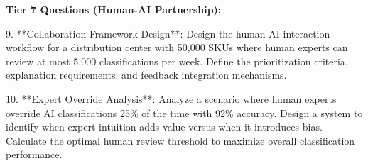\documentclass{article}
\begin{document}
\textbf{Tier 7 Questions (Human-AI Partnership):}

9. **Collaboration Framework Design**: Design the human-AI interaction workflow for a distribution center with 50,000 SKUs where human experts can review at most 5,000 classifications per week. Define the prioritization criteria, explanation requirements, and feedback integration mechanisms.

10. **Expert Override Analysis**: Analyze a scenario where human experts override AI classifications 25\% of the time with 92\% accuracy. Design a system to identify when expert intuition adds value versus when it introduces bias. Calculate the optimal human review threshold to maximize overall classification performance.
\end{document}

